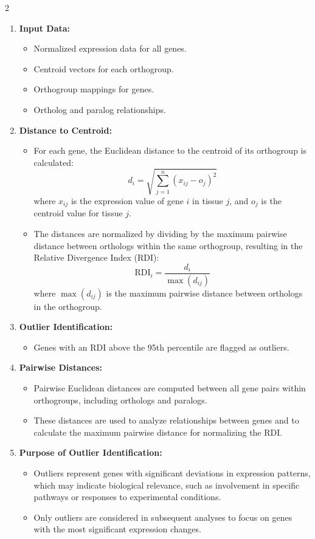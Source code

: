 2\documentclass{article}
\begin{document}
\begin{enumerate}
    \item \textbf{Input Data:}
    \begin{itemize}
        \item Normalized expression data for all genes.
        \item Centroid vectors for each orthogroup.
        \item Orthogroup mappings for genes.
        \item Ortholog and paralog relationships.
    \end{itemize}

    \item \textbf{Distance to Centroid:}
    \begin{itemize}
        \item For each gene, the Euclidean distance to the centroid of its orthogroup is calculated:
        \[
        d_i = \sqrt{\sum_{j=1}^n (x_{ij} - o_j)^2}
        \]
        where \( x_{ij} \) is the expression value of gene \( i \) in tissue \( j \), and \( o_j \) is the centroid value for tissue \( j \).
        \item The distances are normalized by dividing by the maximum pairwise distance between orthologs within the same orthogroup, resulting in the Relative Divergence Index (RDI):
        \[
        \text{RDI}_i = \frac{d_i}{\max(d_{ij})}
        \]
        where \( \max(d_{ij}) \) is the maximum pairwise distance between orthologs in the orthogroup.
    \end{itemize}

    \item \textbf{Outlier Identification:}
    \begin{itemize}
        \item Genes with an RDI above the 95th percentile are flagged as outliers.
    \end{itemize}

    \item \textbf{Pairwise Distances:}
    \begin{itemize}
        \item Pairwise Euclidean distances are computed between all gene pairs within orthogroups, including orthologs and paralogs.
        \item These distances are used to analyze relationships between genes and to calculate the maximum pairwise distance for normalizing the RDI.
    \end{itemize}

    \item \textbf{Purpose of Outlier Identification:}
    \begin{itemize}
        \item Outliers represent genes with significant deviations in expression patterns, which may indicate biological relevance, such as involvement in specific pathways or responses to experimental conditions.
        \item Only outliers are considered in subsequent analyses to focus on genes with the most significant expression changes.
    \end{itemize}
\end{enumerate}
\end{document}
